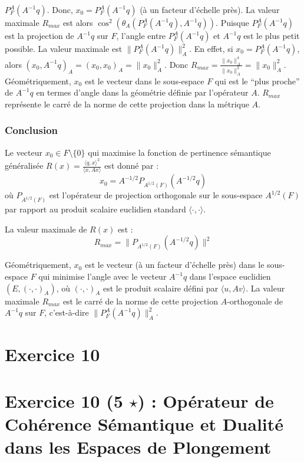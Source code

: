 \documentclass[11pt,a4paper]{report}
\begin{document}
\begin{enumerate}
\begin{itemize}
\begin{enumerate}
      \(P_F^A(A^{-1}q)\). Donc, \(x_0 = P_F^A(A^{-1}q)\) (à un facteur
      d'échelle près). La valeur maximale \(R_{max}\) est alors
      \(\cos^2(\theta_A(P_F^A(A^{-1}q), A^{-1}q))\). Puisque
      \(P_F^A(A^{-1}q)\) est la projection de \(A^{-1}q\) sur \(F\),
      l'angle entre \(P_F^A(A^{-1}q)\) et \(A^{-1}q\) est le plus petit
      possible. La valeur maximale est \(\|P_F^A(A^{-1}q)\|_A^2\). En
      effet, si \(x_0 = P_F^A(A^{-1}q)\), alors
      \((x_0, A^{-1}q)_A = (x_0, x_0)_A = \|x_0\|_A^2\). Donc
      \(R_{max} = \frac{\|x_0\|_A^4}{\|x_0\|_A^2} = \|x_0\|_A^2\).
      Géométriquement, \(x_0\) est le vecteur dans le sous-espace \(F\)
      qui est le ``plus proche'' de \(A^{-1}q\) en termes d'angle dans
      la géométrie définie par l'opérateur \(A\). \(R_{max}\) représente
      le carré de la norme de cette projection dans la métrique \(A\).
    \end{enumerate}
  \end{itemize}
\end{enumerate}

\hypertarget{conclusion}{%
\subsubsection{Conclusion}\label{conclusion}}

Le vecteur \(x_0 \in F \setminus \{0\}\) qui maximise la fonction de
pertinence sémantique généralisée
\(R(x) = \frac{\langle q, x \rangle^2}{\langle x, Ax \rangle}\) est
donné par : \[x_0 = A^{-1/2}P_{A^{1/2}(F)}(A^{-1/2}q)\] où
\(P_{A^{1/2}(F)}\) est l'opérateur de projection orthogonale sur le
sous-espace \(A^{1/2}(F)\) par rapport au produit scalaire euclidien
standard \(\langle \cdot, \cdot \rangle\).

La valeur maximale de \(R(x)\) est :
\[R_{max} = \|P_{A^{1/2}(F)}(A^{-1/2}q)\|^2\]

Géométriquement, \(x_0\) est le vecteur (à un facteur d'échelle près)
dans le sous-espace \(F\) qui minimise l'angle avec le vecteur
\(A^{-1}q\) dans l'espace euclidien \((E, (\cdot, \cdot)_A)\), où
\((\cdot, \cdot)_A\) est le produit scalaire défini par
\(\langle u, Av \rangle\). La valeur maximale \(R_{max}\) est le carré
de la norme de cette projection \(A\)-orthogonale de \(A^{-1}q\) sur
\(F\), c'est-à-dire \(\|P_F^A(A^{-1}q)\|_A^2\).


\section*{Exercice 10}
\hypertarget{exercice-10-5-star-opuxe9rateur-de-cohuxe9rence-suxe9mantique-et-dualituxe9-dans-les-espaces-de-plongement}{%
\section{\texorpdfstring{Exercice 10 (5 \(\star\)) : Opérateur de
Cohérence Sémantique et Dualité dans les Espaces de
Plongement}{Exercice 10 (5 \textbackslash star) : Opérateur de Cohérence Sémantique et Dualité dans les Espaces de Plongement}}\label{exercice-10-5-star-opuxe9rateur-de-cohuxe9rence-suxe9mantique-et-dualituxe9-dans-les-espaces-de-plongement}}
\end{document}
